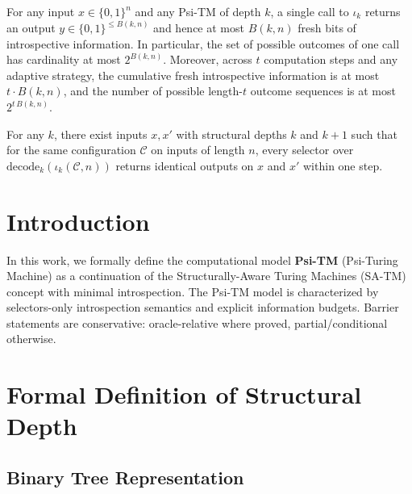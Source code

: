 
\begin{lemma}
\label{lem:one-step-budget-1}
For any input $x\in\{0,1\}^n$ and any Psi-TM of depth $k$, a single call to $\iota_k$ returns an output $y\in\{0,1\}^{\le B(k,n)}$ and hence at most $B(k,n)$ fresh bits of introspective information. In particular, the set of possible outcomes of one call has cardinality at most $2^{B(k,n)}$. Moreover, across $t$ computation steps and any adaptive strategy, the cumulative fresh introspective information is at most $t\cdot B(k,n)$, and the number of possible length-$t$ outcome sequences is at most $2^{t\,B(k,n)}$.
\end{lemma}

\begin{lemma}
\label{lem:selector-indistinguishability-1}
For any $k$, there exist inputs $x,x'$ with structural depths $k$ and $k+1$ such that for the same configuration $\mathcal{C}$ on inputs of length $n$, every selector over $\mathrm{decode}_k(\iota_k(\mathcal{C},n))$ returns identical outputs on $x$ and $x'$ within one step.
\end{lemma}

\section{Introduction}

In this work, we formally define the computational model \textbf{Psi-TM} (Psi-Turing Machine) as a continuation of the Structurally-Aware Turing Machines (SA-TM) concept with minimal introspection. The Psi-TM model is characterized by selectors-only introspection semantics and explicit information budgets. Barrier statements are conservative: oracle-relative where proved, partial/conditional otherwise.

\section{Formal Definition of Structural Depth}

\subsection{Binary Tree Representation}

